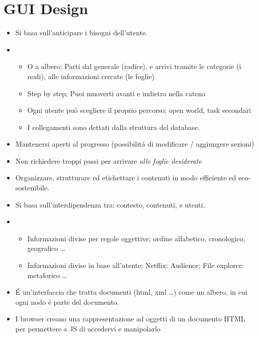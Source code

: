\chapter{GUI Design}

\begin{itemize}
    \item Si basa sull'anticipare i bisogni dell'utente.
    \item {}
    \begin{itemize}
        \item {} O a albero; Parti dal generale (radice), e arrivi tramite le categorie (i nodi), alle informazioni cercate (le foglie)
        \item {} Step by step; Puoi muoverti avanti e indietro nella catena
        \item {} Ogni utente pu\`o scegliere il proprio percorso; open world, task secondari
        \item {} I collegamenti sono dettati dalla struttura del database.
    \end{itemize}
    \item Mantenersi aperti al progresso (possibilit\'a di modificare / aggiungere sezioni)
    \item Non richiedere troppi passi per arrivare \textit{alle foglie desiderate}
    \item {} Organizzare, strutturare ed etichettare i contenuti in modo efficiente ed eco-sostenibile.
    \item Si basa sull'interdipendenza tra: contesto, contenuti, e utenti.
    \item {}
    \begin{itemize}
        \item {} Informazioni divise per regole oggettive; ordine alfabetico, cronologico, geografico \dots
        \item {} Informazioni divise in base all'utente; Netflix: Audience; File explorer: metaforico \dots
    \end{itemize}
    \item {} \'E un'interfaccia che tratta documenti (html, xml \dots) come un albero, in cui ogni nodo \'e parte del documento.
    \item I browser creano una rappresentazione ad oggetti di un documento HTML per permettere a JS di accedervi e manipolarlo
\end{itemize}